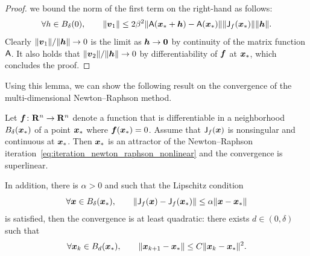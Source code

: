 \begin{proof}
    we bound the norm of the first term on the right-hand as follows:
    \begin{align*}
        \forall h \in B_{\delta}(0), \qquad
        \lVert\mathbf{\boldsymbol{v}}_1\rVert
        \leq 2 \beta^2 \lVert\mathsf A(\mathbf{\boldsymbol{x}}_* + \mathbf{\boldsymbol{h}}) - \mathsf A(\mathbf{\boldsymbol{x}}_*)\rVert \lVert\mathsf J_f(\mathbf{\boldsymbol{x}}_*)\rVert \lVert\mathbf{\boldsymbol{h}}\rVert.
    \end{align*}
    Clearly $\lVert\mathbf{\boldsymbol{v}}_1\rVert / \lVert\mathbf{\boldsymbol{h}}\rVert \to 0$ is the limit as $\mathbf{\boldsymbol{h}} \to \mathbf{\boldsymbol{0}}$ by continuity of the matrix function $\mathsf A$.
    It also holds that $\lVert\mathbf{\boldsymbol{v}}_2\rVert / \lVert\mathbf{\boldsymbol{h}}\rVert \to 0$ by differentiability of $\mathbf{\boldsymbol{f}}$ at $\mathbf{\boldsymbol{x}}_*$,
    which concludes the proof.
\end{proof}

Using this lemma,
we can show the following result on the convergence of the multi-dimensional Newton--Raphson method.
\begin{theorem}
    Let $\mathbf{\boldsymbol{f}}\colon \mathbf R^n \to \mathbf R^n$ denote a function that is differentiable in a neighborhood~$B_{\delta}(\mathbf{\boldsymbol{x}}_*)$
    of a point $\mathbf{\boldsymbol{x}}_*$ where $\mathbf{\boldsymbol{f}}(\mathbf{\boldsymbol{x}}_*) = 0$.
    Assume that $\mathsf J_f(\mathbf{\boldsymbol{x}})$ is nonsingular and continuous at $\mathbf{\boldsymbol{x}}_*$.
    Then $\mathbf{\boldsymbol{x}}_*$ is an attractor of the Newton--Raphson iteration~\eqref{eq:iteration_newton_raphson_nonlinear}
    and the convergence is superlinear.

    In addition,
    there is $\alpha > 0$ and such that the Lipschitz condition
    \[
        \forall \mathbf{\boldsymbol{x}} \in B_{\delta}(\mathbf{\boldsymbol{x}}_*), \qquad
        \lVert\mathsf J_f(\mathbf{\boldsymbol{x}}) - \mathsf J_f(\mathbf{\boldsymbol{x}}_*)\rVert \leq \alpha \lVert\mathbf{\boldsymbol{x}} - \mathbf{\boldsymbol{x}}_*\rVert
    \]
    is satisfied,
    then the convergence is at least quadratic:
    there exists $d \in (0, \delta)$ such that
    \[
        \forall \mathbf{\boldsymbol{x}}_k \in B_{d}(\mathbf{\boldsymbol{x}}_*), \qquad
        \lVert\mathbf{\boldsymbol{x}}_{k+1} - \mathbf{\boldsymbol{x}}_*\rVert\leq C\lVert\mathbf{\boldsymbol{x}}_k - \mathbf{\boldsymbol{x}}_*\rVert^2 .
    \]
\end{theorem}

